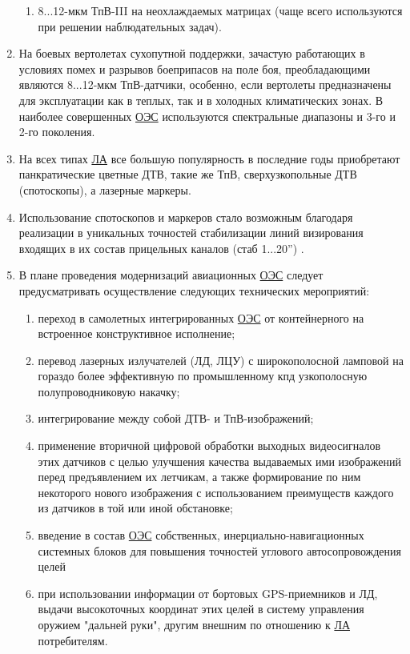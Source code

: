 \begin{enumerate}
\begin{enumerate}
		
		\item 8...12-мкм ТпВ-III на неохлаждаемых матрицах (чаще всего используются при решении наблюдательных задач).
	\end{enumerate}
	\item На боевых вертолетах сухопутной поддержки, зачастую работающих в условиях помех и разрывов боеприпасов на поле боя, преобладающими являются 8...12-мкм ТпВ-датчики, особенно, если вертолеты предназначены для эксплуатации как в теплых, так и в холодных климатических зонах. В наиболее совершенных  \hyperref[acroEOS]{ОЭС} используются спектральные диапазоны и 3-го и 2-го поколения. 
	\item На всех типах  \hyperref[acroLA]{ЛА} все большую популярность в последние годы приобретают панкратические цветные ДТВ, такие же ТпВ, сверхузкопольные ДТВ (спотоскопы), а лазерные маркеры. 
	\item Использование спотоскопов и маркеров стало возможным благодаря реализации в уникальных точностей стабилизации линий визирования входящих в их состав прицельных каналов (стаб 1...20'') .
	\item В плане проведения модернизаций авиационных  \hyperref[acroEOS]{ОЭС} следует предусматривать осуществление следующих технических мероприятий: 
	\begin{enumerate}
		\item переход в самолетных интегрированных  \hyperref[acroEOS]{ОЭС} от контейнерного на встроенное конструктивное исполнение; 
		\item перевод лазерных излучателей (ЛД, ЛЦУ) с широкополосной ламповой на гораздо более эффективную по промышленному кпд узкополосную полупроводниковую накачку; 
		\item интегрирование между собой ДТВ- и ТпВ-изображений; 
		\item применение вторичной цифровой обработки выходных видеосигналов этих датчиков с целью улучшения качества выдаваемых ими изображений перед предъявлением их летчикам, а также формирование по ним некоторого нового изображения с использованием преимуществ каждого из датчиков в той или иной обстановке; 
		\item введение в состав  \hyperref[acroEOS]{ОЭС} собственных, инерциально-навигационных системных блоков для повышения точностей углового автосопровождения целей
		\item при использовании информации от бортовых GPS-приемников и ЛД, выдачи высокоточных координат этих целей в систему управления оружием "дальней руки", другим внешним по отношению к  \hyperref[acroLA]{ЛА} потребителям. 
	\end{enumerate}
\end{enumerate}

